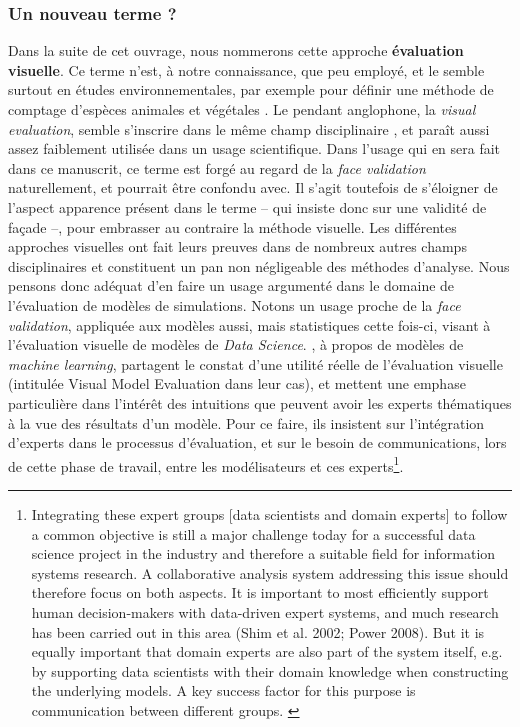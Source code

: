 \subsubsection{Un nouveau terme ?} Dans la suite de cet ouvrage, nous nommerons cette approche \og \textbf{évaluation visuelle}\fg{}.
Ce terme n'est, à notre connaissance, que peu employé, et le semble surtout en études environnementales, par exemple pour définir une méthode de comptage d'espèces animales et végétales \autocite[par exemple][]{harmelin-vivien_evaluation_1985}.
Le pendant anglophone, la \og \textit{visual evaluation}\fg{}, semble s'inscrire dans le même champ disciplinaire \autocite[par exemple][]{horst_assessment_1984}, et paraît aussi assez faiblement utilisée dans un usage scientifique.
Dans l'usage qui en sera fait dans ce manuscrit, ce terme est forgé au regard de la \og \textit{face validation}\fg{} naturellement, et pourrait être confondu avec.
Il s'agit toutefois de s'éloigner de l'aspect \og apparence\fg{} présent dans le terme -- qui insiste donc sur une validité de façade --, pour embrasser au contraire la méthode visuelle.
Les différentes approches visuelles ont fait leurs preuves dans de nombreux autres champs disciplinaires et constituent un pan non négligeable des méthodes d'analyse.
Nous pensons donc adéquat d'en faire un usage argumenté dans le domaine de l'évaluation de modèles de simulations.
Notons un usage proche de la \textit{face validation}, appliquée aux modèles aussi, mais statistiques cette fois-ci, visant à l'évaluation visuelle de modèles de \og \textit{Data Science}\fg{}.
\textcite{eilers_its_2017}, à propos de modèles de \textit{machine learning}, partagent le constat d'une utilité réelle de l'évaluation visuelle (intitulée \og Visual Model Evaluation\fg{} dans leur cas), et mettent une emphase particulière dans l'intérêt des intuitions que peuvent avoir les experts thématiques à la vue des résultats d'un modèle.
Pour ce faire, ils insistent sur l'intégration d'experts dans le processus d'évaluation, et sur le besoin de communications, lors de cette phase de travail, entre les modélisateurs et ces experts\footnote{
	\og Integrating these expert groups [data scientists and domain experts] to follow a common objective is still a major challenge today for a successful data science project in the industry and therefore a suitable field for information systems research.
	A collaborative analysis system addressing this issue should therefore focus on both aspects. It is important to most efficiently support human decision-makers with data-driven expert systems, and much research has been carried out in this area (Shim et al. 2002; Power 2008).
	But it is equally important that domain experts are also part of the system itself, e.g. by supporting data scientists with their domain knowledge when constructing the underlying models.
	A key success factor for this purpose is communication between different groups.\fg{} \autocite[2]{eilers_its_2017}
}.


